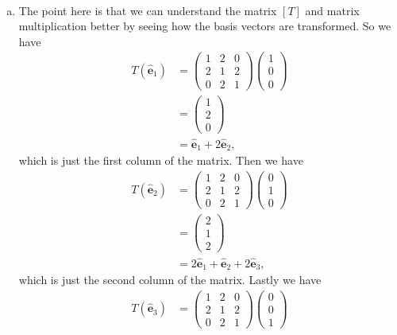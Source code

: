 \documentclass[12pt]{article} %
\newcommand{\ehat}{\boldsymbol{\hat{e}}}
\begin{document}
\begin{solution}~
\begin{enumerate}[(a)]
    \item The point here is that we can understand the matrix $[T]$ and matrix multiplication better by seeing how the basis vectors are transformed. So we have
    \begin{align*}
        T(\ehat_1) &= \begin{pmatrix}
1& 2& 0\\
2& 1& 2\\
0& 2& 1
\end{pmatrix} \begin{pmatrix} 1 \\ 0 \\ 0 \end{pmatrix}\\
&= \begin{pmatrix} 1 \\ 2 \\ 0 \end{pmatrix}\\
&= \ehat_1 + 2 \ehat_2,
    \end{align*}
    which is just the first column of the matrix. Then we have
    \begin{align*}
                T(\ehat_2) &= \begin{pmatrix}
1& 2& 0\\
2& 1& 2\\
0& 2& 1
\end{pmatrix} \begin{pmatrix} 0 \\ 1 \\ 0 \end{pmatrix}\\
&= \begin{pmatrix} 2 \\ 1 \\ 2 \end{pmatrix}\\
&= 2\ehat_1 + \ehat_2 + 2\ehat_3,
    \end{align*}
    which is just the second column of the matrix. Lastly we have
    \begin{align*}
                T(\ehat_3) &= \begin{pmatrix}
1& 2& 0\\
2& 1& 2\\
0& 2& 1
\end{pmatrix} \begin{pmatrix} 0 \\ 0 \\ 1 \end{pmatrix}\\

\end{align*}
\end{enumerate}
\end{solution}
\end{document}
